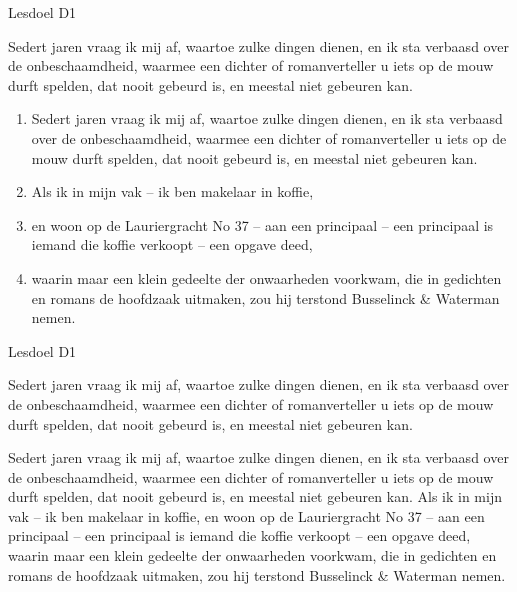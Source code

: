 \begin{minipage}[t]{\lesdoelwidth}
    Lesdoel D1
\end{minipage}\hspace{\lesspacingwidth}%
\begin{minipage}[t]{\lesinhoudwidth}
    Sedert jaren vraag ik mij af, waartoe zulke dingen dienen, en ik sta verbaasd over de onbeschaamdheid, waarmee een dichter of romanverteller u iets op de mouw durft spelden, dat nooit gebeurd is, en meestal niet gebeuren kan.
\end{minipage}\hspace{\lesspacingwidth}%
\begin{minipage}[t]{\lesactiviteitwidth}
    \vspace{-3.5mm}
    \begin{enumerate}[wide,labelwidth=!,labelindent=0pt,itemsep=0pt]
        \item{Sedert jaren vraag ik mij af, waartoe zulke dingen dienen, en ik sta verbaasd over de onbeschaamdheid, waarmee een dichter of romanverteller u iets op de mouw durft spelden, dat nooit gebeurd is, en meestal niet gebeuren kan.}
        \item{Als ik in mijn vak -- ik ben makelaar in koffie, }
        \item{en woon op de Lauriergracht No 37 -- aan een principaal -- een principaal is iemand die koffie verkoopt -- een opgave deed, }
        \item{waarin maar een klein gedeelte der onwaarheden voorkwam, die in gedichten en romans de hoofdzaak uitmaken, zou hij terstond Busselinck \& Waterman nemen.}
    \end{enumerate}
    
\end{minipage}

\newpage
{}
\begin{minipage}[t]{\lesdoelwidth}
    Lesdoel D1
\end{minipage}\hspace{\lesspacingwidth}%
\begin{minipage}[t]{\lesinhoudwidth}
    Sedert jaren vraag ik mij af, waartoe zulke dingen dienen, en ik sta verbaasd over de onbeschaamdheid, waarmee een dichter of romanverteller u iets op de mouw durft spelden, dat nooit gebeurd is, en meestal niet gebeuren kan.
\end{minipage}\hspace{\lesspacingwidth}%
\begin{minipage}[t]{\lesactiviteitwidth}
    Sedert jaren vraag ik mij af, waartoe zulke dingen dienen, en ik sta verbaasd over de onbeschaamdheid, waarmee een dichter of romanverteller u iets op de mouw durft spelden, dat nooit gebeurd is, en meestal niet gebeuren kan.
    Als ik in mijn vak -- ik ben makelaar in koffie, en woon op de Lauriergracht No 37 -- aan een principaal -- een principaal is iemand die koffie verkoopt -- een opgave deed, waarin maar een klein gedeelte der onwaarheden voorkwam, die in gedichten en romans de hoofdzaak uitmaken, zou hij terstond Busselinck \& Waterman nemen.
\end{minipage}